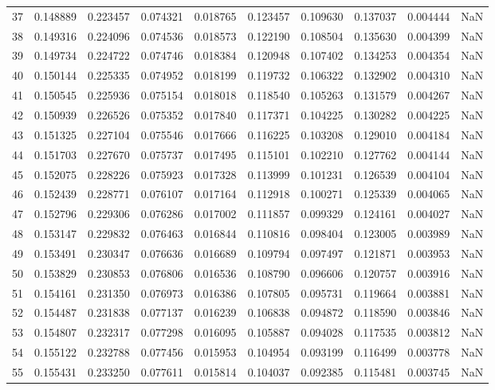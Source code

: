 \begin{tabular}{lrrrrrrrrr}
37 & 0.148889 & 0.223457 & 0.074321 & 0.018765 & 0.123457 & 0.109630 & 0.137037 & 0.004444 & NaN \\
38 & 0.149316 & 0.224096 & 0.074536 & 0.018573 & 0.122190 & 0.108504 & 0.135630 & 0.004399 & NaN \\
39 & 0.149734 & 0.224722 & 0.074746 & 0.018384 & 0.120948 & 0.107402 & 0.134253 & 0.004354 & NaN \\
40 & 0.150144 & 0.225335 & 0.074952 & 0.018199 & 0.119732 & 0.106322 & 0.132902 & 0.004310 & NaN \\
41 & 0.150545 & 0.225936 & 0.075154 & 0.018018 & 0.118540 & 0.105263 & 0.131579 & 0.004267 & NaN \\
42 & 0.150939 & 0.226526 & 0.075352 & 0.017840 & 0.117371 & 0.104225 & 0.130282 & 0.004225 & NaN \\
43 & 0.151325 & 0.227104 & 0.075546 & 0.017666 & 0.116225 & 0.103208 & 0.129010 & 0.004184 & NaN \\
44 & 0.151703 & 0.227670 & 0.075737 & 0.017495 & 0.115101 & 0.102210 & 0.127762 & 0.004144 & NaN \\
45 & 0.152075 & 0.228226 & 0.075923 & 0.017328 & 0.113999 & 0.101231 & 0.126539 & 0.004104 & NaN \\
46 & 0.152439 & 0.228771 & 0.076107 & 0.017164 & 0.112918 & 0.100271 & 0.125339 & 0.004065 & NaN \\
47 & 0.152796 & 0.229306 & 0.076286 & 0.017002 & 0.111857 & 0.099329 & 0.124161 & 0.004027 & NaN \\
48 & 0.153147 & 0.229832 & 0.076463 & 0.016844 & 0.110816 & 0.098404 & 0.123005 & 0.003989 & NaN \\
49 & 0.153491 & 0.230347 & 0.076636 & 0.016689 & 0.109794 & 0.097497 & 0.121871 & 0.003953 & NaN \\
50 & 0.153829 & 0.230853 & 0.076806 & 0.016536 & 0.108790 & 0.096606 & 0.120757 & 0.003916 & NaN \\
51 & 0.154161 & 0.231350 & 0.076973 & 0.016386 & 0.107805 & 0.095731 & 0.119664 & 0.003881 & NaN \\
52 & 0.154487 & 0.231838 & 0.077137 & 0.016239 & 0.106838 & 0.094872 & 0.118590 & 0.003846 & NaN \\
53 & 0.154807 & 0.232317 & 0.077298 & 0.016095 & 0.105887 & 0.094028 & 0.117535 & 0.003812 & NaN \\
54 & 0.155122 & 0.232788 & 0.077456 & 0.015953 & 0.104954 & 0.093199 & 0.116499 & 0.003778 & NaN \\
55 & 0.155431 & 0.233250 & 0.077611 & 0.015814 & 0.104037 & 0.092385 & 0.115481 & 0.003745 & NaN \\

\end{tabular}
